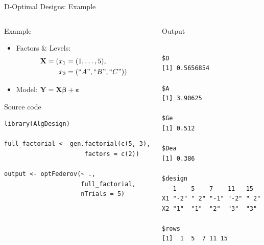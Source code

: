 \documentclass[10pt, compress, aspectratio=169, xcolor={table,usenames,dvipsnames}]{beamer}
\begin{document}
\begin{frame}[label={sec:orgd15074e},fragile]{D-Optimal Designs: Example}
 \begin{columns}
\begin{column}{0.6\columnwidth}
\begin{block}{Example}
\begin{itemize}
\item Factors \& Levels:
\begin{align*}
\mathbf{X} = (x_1 = & \; (1, \dots, 5), \\
x_2 = & \; (``A", ``B", ``C"))
\end{align*}
\item Model: \(\mathbf{Y} = \mathbf{X}\bm{\beta} + \bm{\varepsilon}\)
\end{itemize}

\begin{block}{Source code}
\vspace{-.2cm}

\lstset{language=r,label= ,caption= ,captionpos=b,numbers=none}
\begin{lstlisting}
library(AlgDesign)

full_factorial <- gen.factorial(c(5, 3),
                      factors = c(2))

output <- optFederov(~ .,
                     full_factorial,
                     nTrials = 5)
\end{lstlisting}
\end{block}
\end{block}
\end{column}

\begin{column}{0.4\columnwidth}
\begin{block}{Output}
\vspace{-.2cm}
\scriptsize

\begin{verbatim}

$D
[1] 0.5656854

$A
[1] 3.90625

$Ge
[1] 0.512

$Dea
[1] 0.386

$design
   1    5    7    11   15
X1 "-2" " 2" "-1" "-2" " 2"
X2 "1"  "1"  "2"  "3"  "3"

$rows
[1]  1  5  7 11 15
\end{verbatim}


\normalsize
\end{block}
\end{column}
\end{columns}
\end{frame}
\end{document}
